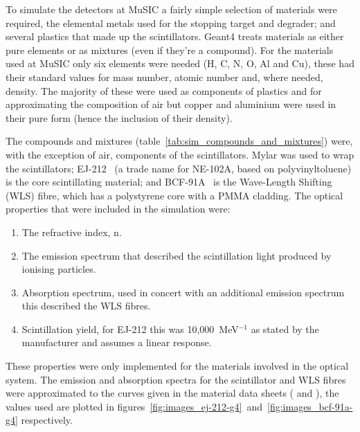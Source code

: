 To simulate the detectors at MuSIC a fairly simple selection of materials were required, the elemental metals used for the stopping target and degrader; and several plastics that made up the scintillators. Geant4 treats materials as either pure elements or as mixtures (even if they're a compound). For the materials used at MuSIC only six elements were needed (H, C, N, O, Al and Cu), these had their standard values for mass number, atomic number and, where needed, density. The majority of these were used as components of plastics and for approximating the composition of air but copper and aluminium were used in their pure form (hence the inclusion of their density). 

The compounds and mixtures (table~\ref{tab:sim_compounds_and_mixtures}) were, with the exception of air, components of the scintillators. Mylar was used to wrap the scintillators; EJ-212~\cite{ej_212} (a trade name for NE-102A, based on polyvinyltoluene) is the core scintillating material; and BCF-91A~\cite{bcf_91a} is the Wave-Length Shifting (WLS) fibre, which has a polystyrene core with a PMMA cladding. The optical properties that were included in the simulation were:
\begin{enumerate}
  \item The refractive index, n.
  \item The emission spectrum that described the scintillation light produced by ionising particles.
  \item Absorption spectrum, used in concert with an additional emission spectrum this described the WLS fibres.
  \item Scintillation yield, for EJ-212 this was 10,000~MeV\(^{-1}\) as stated by the manufacturer and assumes a linear response.
\end{enumerate}
These properties were only implemented for the materials involved in the optical system. The emission and absorption spectra for the scintillator and WLS fibres were approximated to the curves given in the material data sheets (\cite{ej_212} and \cite{bcf_91a}), the values used are plotted in  figures~\ref{fig:images_ej-212-g4}~and~\ref{fig:images_bcf-91a-g4} respectively.

